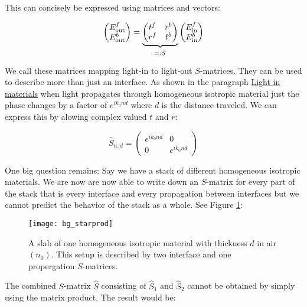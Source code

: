 This can concisely be expressed using matrices and vectors:

\begin{equation}
\begin{pmatrix}
    E^f_{\mathrm{out}} \\
    E^b_{\mathrm{out}}
\end{pmatrix} =
\underbrace{
\begin{pmatrix}
    t^f & r^b \\
    r^f & t^b
\end{pmatrix}
}_{
 =: \hat{S}
}
\begin{pmatrix}
    E^f_{\mathrm{in}} \\
    E^b_{\mathrm{in}}
\end{pmatrix}
\end{equation}

We call these matrices mapping light-in to light-out $S$-matrices. They can be used to describe more than just an interface. As shown in the paragraph \hyperref[par:light_in_materials]{Light in materials} when light propagates through homogeneous isotropic material just the phase changes by a factor of $e^{i k_0 n d}$ where $d$ is the distance traveled. We can express this by alowing complex valued $t$ and $r$:

\begin{equation}
    \hat S_{n, d} =
    \begin{pmatrix}
        e^{i k_0 n d} & 0 \\
        0 & e^{i k_0 n d}
    \end{pmatrix}
\end{equation}

One big question remains: Say we have a stack of different homogeneous isotropic materials. We are now are now able to write down an $S$-matrix for every part of the stack that is every interface and every propagation between interfaces but we cannot predict the behavior of the stack as a whole. See Figure \ref{fig:bg:star_prod}:

\begin{figure}[H]
    \centering
    \texttt{[image: bg\_starprod]}
    \caption{A slab of one homogeneous isotropic material with thickness $d$ in air $(n_0)$. This setup is described by two interface and one propergation $S$-matrices.}
    \label{fig:bg:star_prod}
\end{figure}



The combined $S$-matrix $\hat S$ consisting of $\hat S_1$ and $\hat S_2$ cannot be obtained by simply using the matrix product. The result would be:

